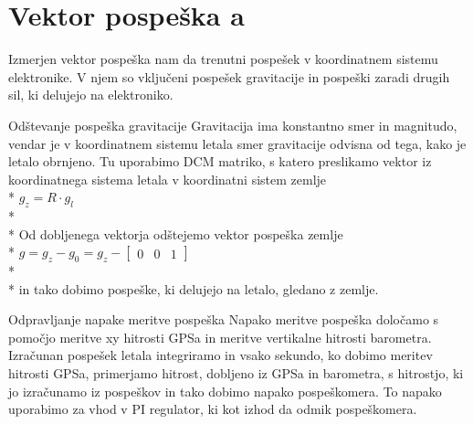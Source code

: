 \documentclass[]{article}
\begin{document}
\clearpage
\section{Vektor pospeška a}
Izmerjen vektor pospeška nam da trenutni pospešek v koordinatnem sistemu elektronike. V njem so vključeni pospešek gravitacije in pospeški zaradi drugih sil, ki delujejo na elektroniko.
\begin {subsection}{Odštevanje pospeška gravitacije}
Gravitacija ima konstantno smer in magnitudo, vendar je v koordinatnem sistemu letala smer gravitacije odvisna od tega, kako je letalo obrnjeno. Tu uporabimo DCM matriko, s katero preslikamo vektor iz koordinatnega sistema letala v koordinatni sistem zemlje\\*
$ g_{z} = R\cdot g_{l} $\\*\\*
Od dobljenega vektorja odštejemo vektor pospeška zemlje\\*
$ g = g_{z} - g_{0} = g_{z} - \left[ \begin{array}{ccc}
0 & 0 & 1
\end{array} \right]  $\\*\\*
in tako dobimo pospeške, ki delujejo na letalo, gledano z zemlje. 
\begin {subsection}{Odpravljanje napake meritve pospeška}
Napako meritve pospeška določamo s pomočjo meritve xy hitrosti GPSa in meritve vertikalne hitrosti barometra. Izračunan pospešek letala integriramo in vsako sekundo, ko dobimo meritev hitrosti GPSa, primerjamo hitrost, dobljeno iz GPSa in barometra, s hitrostjo, ki jo izračunamo iz pospeškov in tako dobimo napako pospeškomera. To napako uporabimo za vhod v PI regulator, ki kot izhod da odmik pospeškomera.
\end {subsection}
\end {subsection}
\clearpage
\end{document}

